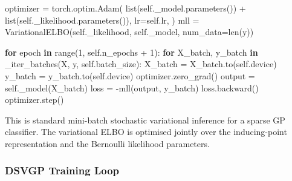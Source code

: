 \documentclass[
  letterpaper,
  DIV=11,
  numbers=noendperiod]{scrartcl}
\newenvironment{Shaded}{\begin{snugshade}}{\end{snugshade}}
\newcommand{\BuiltInTok}[1]{\textcolor[rgb]{0.00,0.23,0.31}{#1}}
\newcommand{\ControlFlowTok}[1]{\textcolor[rgb]{0.00,0.23,0.31}{\textbf{#1}}}
\newcommand{\DecValTok}[1]{\textcolor[rgb]{0.68,0.00,0.00}{#1}}
\newcommand{\KeywordTok}[1]{\textcolor[rgb]{0.00,0.23,0.31}{\textbf{#1}}}
\newcommand{\NormalTok}[1]{\textcolor[rgb]{0.00,0.23,0.31}{#1}}
\newcommand{\OperatorTok}[1]{\textcolor[rgb]{0.37,0.37,0.37}{#1}}
\newcommand{\VariableTok}[1]{\textcolor[rgb]{0.07,0.07,0.07}{#1}}
\begin{document}
\begin{Shaded}
\begin{Highlighting}[]
\NormalTok{optimizer }\OperatorTok{=}\NormalTok{ torch.optim.Adam(}
    \BuiltInTok{list}\NormalTok{(}\VariableTok{self}\NormalTok{.\_model.parameters()) }\OperatorTok{+} \BuiltInTok{list}\NormalTok{(}\VariableTok{self}\NormalTok{.\_likelihood.parameters()),}
\NormalTok{    lr}\OperatorTok{=}\VariableTok{self}\NormalTok{.lr,}
\NormalTok{)}
\NormalTok{mll }\OperatorTok{=}\NormalTok{ VariationalELBO(}\VariableTok{self}\NormalTok{.\_likelihood, }\VariableTok{self}\NormalTok{.\_model, num\_data}\OperatorTok{=}\BuiltInTok{len}\NormalTok{(y))}

\ControlFlowTok{for}\NormalTok{ epoch }\KeywordTok{in} \BuiltInTok{range}\NormalTok{(}\DecValTok{1}\NormalTok{, }\VariableTok{self}\NormalTok{.n\_epochs }\OperatorTok{+} \DecValTok{1}\NormalTok{):}
    \ControlFlowTok{for}\NormalTok{ X\_batch, y\_batch }\KeywordTok{in}\NormalTok{ \_iter\_batches(X, y, }\VariableTok{self}\NormalTok{.batch\_size):}
\NormalTok{        X\_batch }\OperatorTok{=}\NormalTok{ X\_batch.to(}\VariableTok{self}\NormalTok{.device)}
\NormalTok{        y\_batch }\OperatorTok{=}\NormalTok{ y\_batch.to(}\VariableTok{self}\NormalTok{.device)}
\NormalTok{        optimizer.zero\_grad()}
\NormalTok{        output }\OperatorTok{=} \VariableTok{self}\NormalTok{.\_model(X\_batch)}
\NormalTok{        loss   }\OperatorTok{=} \OperatorTok{{-}}\NormalTok{mll(output, y\_batch)}
\NormalTok{        loss.backward()}
\NormalTok{        optimizer.step()}
\end{Highlighting}
\end{Shaded}

This is standard mini-batch stochastic variational inference for a
sparse GP classifier. The variational ELBO is optimised jointly over the
inducing-point representation and the Bernoulli likelihood parameters.

\subsubsection{DSVGP Training Loop}\label{sec-credit-risk-dsvgp-snippet}
\end{document}
